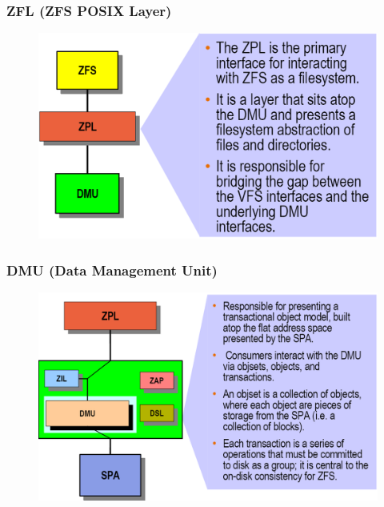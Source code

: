 % 
% 
\begin{frame}[fragile]
    \frametitle{ZFL (ZFS POSIX Layer)}
    \begin{figure}
    \includegraphics[width=0.8\linewidth]{figs/ZFS-zpl.png}
    \end{figure}  
\end{frame}
% 
% 
\begin{frame}[fragile]
    \frametitle{DMU (Data Management Unit)}
    \begin{figure}
    \includegraphics[width=0.8\linewidth]{figs/ZFS-dmu.png}
    \end{figure}
\end{frame}

